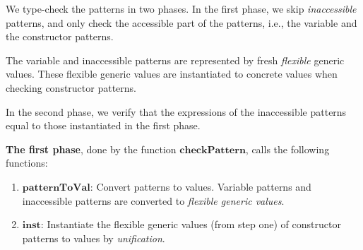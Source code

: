 \documentclass[acmsmall]{acmart}
\begin{document}
We type-check the patterns in two phases. In the first phase, we skip \emph{inaccessible} patterns, and only check the accessible part of the patterns, i.e., the variable and the constructor patterns. 

The variable and inaccessible patterns are represented by fresh \emph{flexible} generic values. These flexible generic values are instantiated to concrete values when checking constructor patterns. 

In the second phase, we verify that the expressions of the inaccessible patterns equal to those instantiated in the first phase.

\textbf{The first phase}, done by the function $\boldsymbol{checkPattern}$, calls the following functions:

\begin{enumerate}
  \item $\boldsymbol{patternToVal}$: Convert patterns to values. Variable patterns and inaccessible patterns are converted to \emph{flexible generic values}.
  \item $\boldsymbol{inst}$: Instantiate the flexible generic values (from step one) of constructor patterns to values by \emph{unification}.
\end{enumerate}
\end{document}
